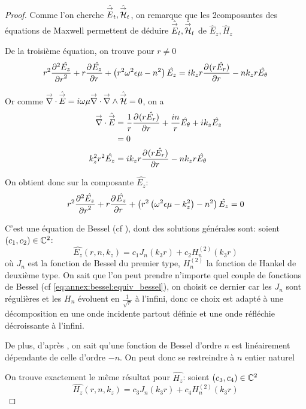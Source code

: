 \begin{proof}
        Comme l'on cherche \(\hat \vE_t, \hat \vH_t\), on remarque que les 2\ieme composantes des équations de Maxwell permettent de déduire \(\hat\vE_t, \hat\vH_t\) de \( \hat E_z, \hat H_z\)

        De la troisième  équation, on trouve pour \(r\not=0\)
        \begin{equation}
        r^2 \ddr[2]{r}{\hat{E_z}} + r\ddr{r}{\hat{E_z}} + \left(r^2\w^2\eps\mu - n^2\right)\hat{E_z} =ik_zr\ddr{r}{(r\hat{E_r})} -  nk_zr\hat{E_\theta}
        \end{equation}

        Or comme \(\vdiv \hat \vE = i\w\mu\vdiv\vrot \hat \vH = 0\), on a
        \begin{align}
            \vdiv\hat \vE &= \frac{1}{r}\ddr{r}{(r\hat{E_r})} + \frac{in}{r}\hat{E_\theta} + ik_z\hat{E_z}
            \\
            &=0
            \\
            k_z^2r^2 \hat{E_z} &= ik_zr\ddr{r}{(r\hat{E_r})} - nk_zr\hat{E_\theta}
        \end{align}

        On obtient donc sur la composante \(\hat{E_z}\):
        \begin{equation}
            r^2 \ddr[2]{r}{\hat{E_z}} + r\ddr{r}{\hat{E_z}} + \left(r^2\left(\w^2\eps\mu - k_z^2\right) - n^2\right)\hat{E_z} = 0
        \end{equation}

        C'est une équation de Bessel (cf \cite[eq (6.80)]{bowman_introduction_1958}), dont des solutions générales sont: soient \((c_1,c_2) \in \CC^2\):
       \begin{equation}
            \hat{E_z}(r,n,k_z) = c_1 J_n\left(k_3r\right) + c_2 H_n^{(2)}\left(k_3r\right)
        \end{equation}
        où \(J_n\) est la fonction de Bessel du premier type, \(H_n^{(2)}\) la fonction de Hankel de deuxième type.
        On sait que l'on peut prendre n'importe quel couple de fonctions de Bessel (cf \eqref{eq:annex:bessel:equiv_bessel}), on choisit ce dernier car les \(J_n\) sont régulières et les \(H_n\) évoluent en \(\frac{1}{\sqrt{r}}\) à l'infini, donc ce choix est adapté à une décomposition en une onde incidente partout définie et une onde réfléchie décroissante à l'infini.

        De plus, d'après \cite[p.~358]{abramowitz_handbook_1964}, on sait qu'une fonction de Bessel d'ordre \(n\) est linéairement dépendante de celle d'ordre \(-n\).
        On peut donc se restreindre à \(n\) entier naturel

        On trouve exactement le même résultat pour \(\hat{H_z}\): soient \((c_3,c_4) \in \CC^2\)
        \begin{equation}
            \hat{H_z}(r,n,k_z) = c_3 J_n\left(k_3r\right) + c_4 H_n^{(2)}\left(k_3r\right)
        \end{equation}
    \end{proof}


